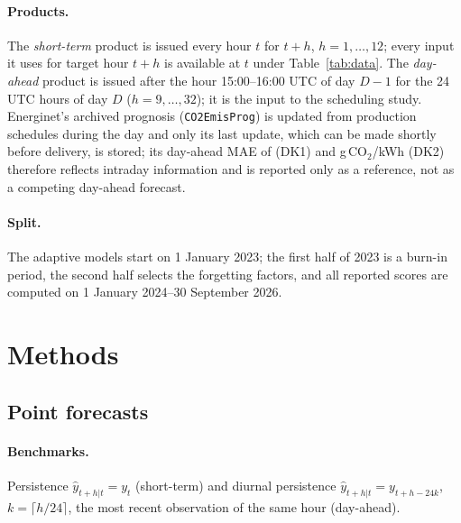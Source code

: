 \documentclass[11pt,a4paper]{article}
\newcommand{\gk}{g\,CO$_2$/kWh}
\begin{document}
\paragraph{Products.}
The \emph{short-term} product is issued every hour $t$ for $t+h$, $h=1,\dots,12$; every input it uses for target hour $t+h$ is available at $t$ under Table~\ref{tab:data}.
The \emph{day-ahead} product is issued after the hour 15:00--16:00 UTC of day $D-1$ for the 24 UTC hours of day $D$ ($h=9,\dots,32$); it is the input to the scheduling study.
Energinet's archived prognosis (\texttt{CO2EmisProg}) is updated from production schedules during the day and only its last update, which can be made shortly before delivery, is stored; its day-ahead MAE of \DKadaMaeProg{} (DK1) and \DKbdaMaeProg{} \gk{} (DK2) therefore reflects intraday information and is reported only as a reference, not as a competing day-ahead forecast.

\paragraph{Split.} The adaptive models start on 1 January 2023; the first half of 2023 is a burn-in period, the second half selects the forgetting factors, and all reported scores are computed on 1 January 2024--30 September 2026.

\section{Methods}
\subsection{Point forecasts}
\paragraph{Benchmarks.} Persistence $\hat y_{t+h|t}=y_t$ (short-term) and diurnal persistence $\hat y_{t+h|t}=y_{t+h-24k}$, $k=\lceil h/24\rceil$, the most recent observation of the same hour (day-ahead).
\end{document}
